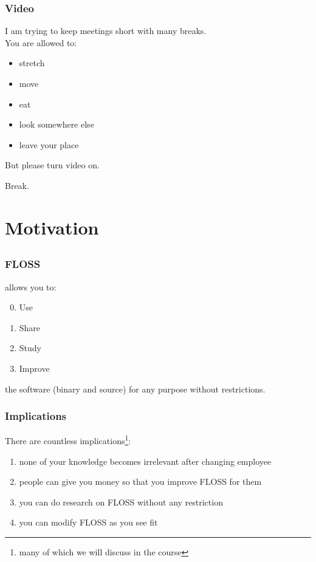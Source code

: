 \begin{assignment}
	\frametitle{Video}
	I am trying to keep meetings short with many breaks. \\
	You are allowed to:
	\begin{itemize}
		\item stretch
		\item move
		\item eat
		\item look somewhere else
		\item leave your place
	\end{itemize}
	\begin{task}
	But please turn video on.
	\end{task}
\end{assignment}

\begin{assignment}
	\begin{task}
	Break.
	\end{task}
\end{assignment}

\section{Motivation}
\subsection{}
\begin{frame}
	\frametitle{FLOSS}
	\floss{} allows you to:
	\vspace{1em}
	\begin{enumerate}
		\setcounter{enumi}{-1}
		\item Use
		\item Share
		\item Study
		\item Improve
	\end{enumerate}
	\vspace{1em}
	the software (binary and source) for any purpose without restrictions.
\end{frame}

\begin{frame}
	\frametitle{Implications}

	There are countless implications\footnote{many of which we will discuss in the course}:
	\begin{enumerate}
		\item none of your knowledge becomes irrelevant after changing employee
		\item people can give you money so that you improve FLOSS for them
		\item you can do research on FLOSS without any restriction
		\item you can modify FLOSS as you see fit
	\end{enumerate}
\end{frame}

